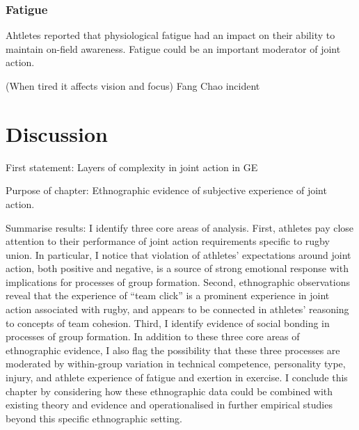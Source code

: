 \begin{CJK}{UTF8}{gbsn}
        \subsubsection{Fatigue}

Ahtletes reported that physiological fatigue had an impact on their ability to maintain on-field awareness.  Fatigue could be an important moderator of joint action.

(When tired it affects vision and focus)
Fang Chao incident






\section{Discussion}

First statement:
  Layers of complexity in joint action in GE

Purpose of chapter:
  Ethnographic evidence of subjective experience of joint action.




Summarise results:
 I identify three core areas of analysis.  First, athletes pay close attention to their performance of joint action requirements specific to rugby union.  In particular, I notice that violation of athletes' expectations around joint action, both positive and negative, is a source of strong emotional response with implications for processes of group formation.  Second, ethnographic observations reveal that the experience of ``team click'' is a prominent experience in joint action associated with rugby, and appears to be connected in athletes' reasoning to concepts of team cohesion.  Third, I identify evidence of social bonding in processes of group formation.  In addition to these three core areas of ethnographic evidence, I also flag the possibility that these three processes are moderated by within-group variation in technical competence, personality type, injury, and athlete experience of fatigue and exertion in exercise.  I conclude this chapter by considering how these ethnographic data could be combined with existing theory and evidence and operationalised in further empirical studies beyond this specific ethnographic setting.


\end{CJK}
